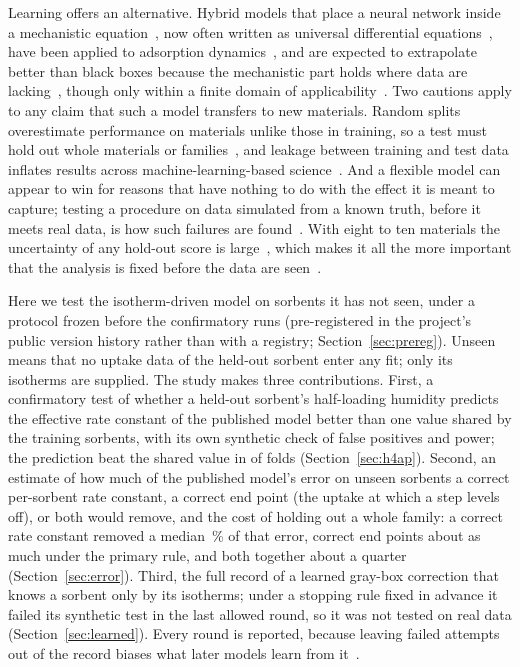 \documentclass[12pt]{article}
\begin{document}
Learning offers an alternative. Hybrid models that place a neural network inside a mechanistic
equation~\cite{Psichogios1992Hybrid,Thompson1994Modeling}, now often written as universal differential
equations~\cite{Rackauckas2020Universal}, have been applied to adsorption
dynamics~\cite{Nogueira2022Using,Subraveti2022Physics,Frandsen2025Systematic}, and are expected to extrapolate better than black boxes
because the mechanistic part holds where data are lacking~\cite{Thompson1994Modeling}, though only within a finite
domain of applicability~\cite{Bangi2023Deep}. Two cautions apply to any
claim that such a model transfers to new materials. Random splits overestimate performance on materials unlike those
in training, so a test must hold out whole materials or families~\cite{Meredig2018Can,Roberts2017Cross}, and leakage
between training and test data inflates results across machine-learning-based science~\cite{Kapoor2023Leakage}. And
a flexible model can appear to win for reasons that have nothing to do with the effect it is meant to capture;
testing a procedure on data simulated from a known truth, before it meets real data, is how such failures are
found~\cite{Cook2006Validation,Talts2018Validating,Modrak2025Simulation}. With eight to ten materials the uncertainty of any hold-out score
is large~\cite{Varoquaux2018Cross}, which makes it all the more important that the analysis is fixed before the data
are seen~\cite{Nosek2018Preregistration}.

Here we test the isotherm-driven model on sorbents it has not seen, under a protocol frozen before the confirmatory
runs (pre-registered in the project's public version history rather than with a registry;
Section~\ref{sec:prereg}). Unseen means that no uptake data of the held-out sorbent enter any fit; only its
isotherms are supplied. The study makes three contributions. First, a confirmatory test of whether a held-out
sorbent's half-loading humidity predicts the effective rate constant of the published model better than one value
shared by the training sorbents, with its own synthetic check of false positives and power; the prediction beat the
shared value in  of  folds (Section~\ref{sec:h4ap}). Second, an estimate of how
much of the published model's error on unseen sorbents a correct per-sorbent rate constant, a correct end point (the
uptake at which a step levels off), or both would remove, and the cost of holding out a whole family: a correct
rate constant removed a median \,\% of that error, correct end points about as much under the
primary rule, and both together about a quarter (Section~\ref{sec:error}). Third, the full record of a learned gray-box correction that knows a sorbent only by its
isotherms; under a stopping rule fixed in advance it failed its synthetic test in the last allowed round, so it was
not tested on real data (Section~\ref{sec:learned}). Every round is reported, because leaving failed attempts out of
the record biases what later models learn from it~\cite{StriethKalthoff2022Machine}.
\end{document}
